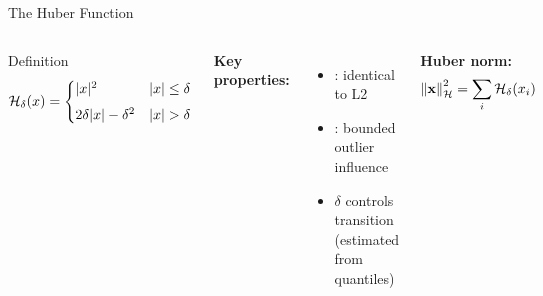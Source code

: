 \begin{frame}{The Huber Function}
  \begin{columns}[T]
      \vspace{0.2em}
  

      \vspace{0.2em}
      \begin{shibuiframe}{Definition}
        \[
          \mathcal{H}_{\delta}(x) =
          \begin{cases}
            \lvert x \rvert^{2}
              & \lvert x \rvert \leq \delta \\[4pt]
            2\delta\lvert x \rvert - \delta^{2}
              & \lvert x \rvert > \delta
          \end{cases}
        \]
      \end{shibuiframe}

      \vspace{0.5em}
      \textbf{Key properties:}
      \begin{itemize}
        \item {}: identical to L2
        \pause
        \item {}: bounded outlier influence
        \pause
        \item $\delta$ controls transition (estimated from quantiles)
      \end{itemize}

      \vspace{0.4em}
      \textbf{Huber norm:}
      \[
        \left\| \mathbf{x} \right\|_{\mathcal{H}}^{2}
          = \sum_{i} \mathcal{H}_{\delta}(x_{i})
      \]

  \end{columns}
\end{frame}

